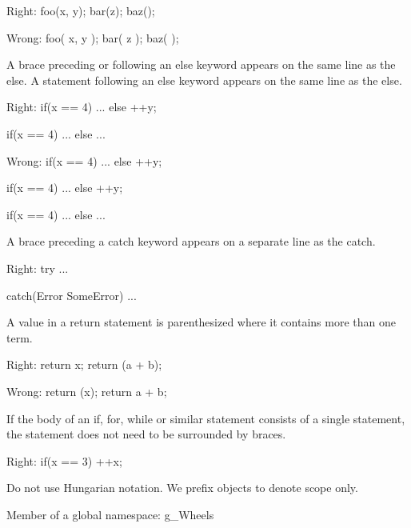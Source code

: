 Right:
\StartCodeExample
\starttyping
foo(x, y);
bar(z);
baz();
\stoptyping
\StopCodeExample

Wrong:
\StartCodeExample
\starttyping
foo( x, y );
bar( z );
baz( );
\stoptyping
\StopCodeExample

\item
A brace preceding or following an else keyword appears on the same line as the else. A statement following an else keyword appears on the same line as the else. 

Right:
\StartCodeExample
\starttyping
if(x == 4)
{
    ...
}
else
  ++y;

if(x == 4)
{
    ...
}
else
{
    ...
}
\stoptyping
\StopCodeExample

Wrong:
\StartCodeExample
\starttyping
if(x == 4) {
    ...
}
else ++y;

if(x == 4) {
    ...
} else ++y;

if(x == 4) {
    ...
}
else {
    ...
}
\stoptyping
\StopCodeExample

\item
A brace preceding a catch keyword appears on a separate line as the catch. 

Right:
\StartCodeExample
\starttyping
try
{
    ...
}

catch(Error SomeError)
{
    ...
}
\stoptyping
\StopCodeExample

\item
A value in a return statement is parenthesized where it contains more than one term.

Right:
\StartCodeExample
\starttyping
return x;
return (a + b);
\stoptyping
\StopCodeExample

Wrong:
\StartCodeExample
\starttyping
return (x);
return a + b;
\stoptyping
\StopCodeExample

\item
If the body of an if, for, while or similar statement consists of a single statement, the statement does not need to be surrounded by braces.


Right:
\StartCodeExample
\starttyping
if(x == 3)
  ++x;
\stoptyping
\StopCodeExample

\stopitemize



\startitemize[3]
\setupwhitespace[big]
\item
Do not use Hungarian notation. We prefix objects to denote scope only.


Member of a global namespace:
\StartCodeExample
\starttyping
g_Wheels
\stoptyping
\StopCodeExample

